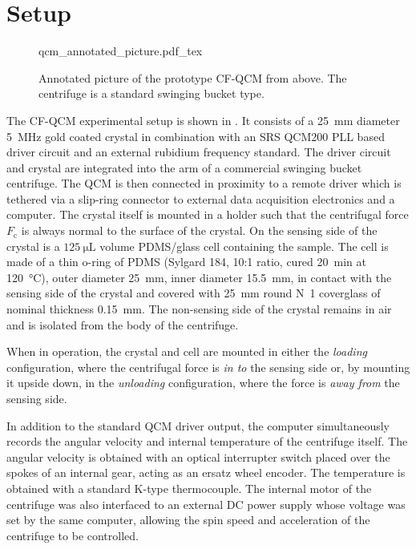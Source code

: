 \section{Setup}
\begin{figure}[ht]
\centering
{qcm_annotated_picture.pdf_tex}
\caption{Annotated picture of the prototype CF-QCM from above.  The
centrifuge is a standard swinging bucket type.}
\label{fig:cfqcmexpsetup}
\end{figure}

The CF-QCM experimental setup is shown in .  It
consists of a \SI{25}{\milli\meter} diameter \SI{5}{\mega\hertz} gold
coated crystal in combination with an SRS QCM200 PLL based driver circuit
and an external rubidium frequency standard.  The driver circuit and
crystal are integrated into the arm of a commercial swinging bucket
centrifuge.  The QCM is then connected in proximity to a remote driver
which is tethered via a slip-ring connector to external data acquisition
electronics and a computer.  The crystal itself is mounted in a holder
such that the centrifugal force $F_\mathrm{c}$ is
always normal to the surface of the crystal.  On the sensing side of the
crystal is a $\SI{125}{\micro\liter}$ volume PDMS/glass cell containing the
sample.  The cell is made of a thin o-ring of PDMS (Sylgard 184, 10:1
ratio, cured \SI{20}{\minute} at \SI{120}{\celsius}),
outer diameter \SI{25}{\milli\meter}, inner diameter
\SI{15.5}{\milli\meter}, in
contact with the sensing side of the crystal and covered with
\SI{25}{\milli\meter} round N~1
coverglass of nominal thickness \SI{0.15}{\milli\meter}.  The non-sensing
side of the crystal remains in air and is isolated from the body of the
centrifuge.  

When in operation, the crystal and cell are mounted in either the
\textit{loading} configuration, where the centrifugal force is \textit{in
to} the sensing side or, by mounting it upside down, in the
\textit{unloading} configuration, where the force is \textit{away from} the
sensing side.

In addition to the standard QCM driver output, the computer simultaneously
records the angular velocity and internal temperature of the centrifuge
itself.  The angular velocity is obtained with an optical interrupter
switch placed over the spokes of an internal gear, acting as an ersatz
wheel encoder.  The temperature is obtained with a standard K-type
thermocouple.  The internal motor of the centrifuge was also interfaced to
an external DC power supply whose voltage was set by the same
computer, allowing the spin speed and acceleration of the centrifuge to be
controlled.


